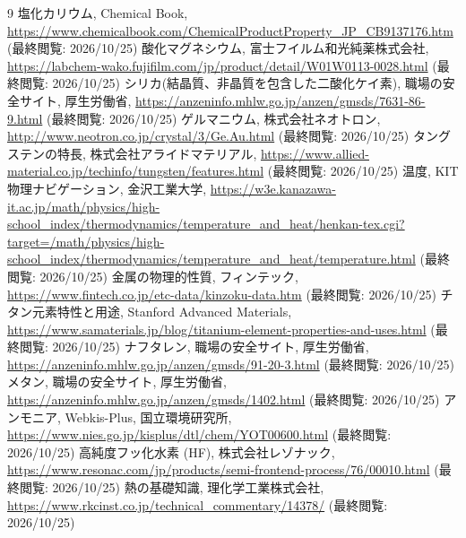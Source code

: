 \documentclass[dvipdfmx, a4paper]{jsarticle}
\begin{document}
  \begin{thebibliography}{9}
     塩化カリウム, Chemical Book, \url{https://www.chemicalbook.com/ChemicalProductProperty_JP_CB9137176.htm} (最終閲覧: 2026/10/25)
     酸化マグネシウム, 富士フイルム和光純薬株式会社, \url{https://labchem-wako.fujifilm.com/jp/product/detail/W01W0113-0028.html} (最終閲覧: 2026/10/25)
     シリカ(結晶質、非晶質を包含した二酸化ケイ素), 職場の安全サイト, 厚生労働省, \url{https://anzeninfo.mhlw.go.jp/anzen/gmsds/7631-86-9.html} (最終閲覧: 2026/10/25)
     ゲルマニウム, 株式会社ネオトロン, \url{http://www.neotron.co.jp/crystal/3/Ge.Au.html} (最終閲覧: 2026/10/25)
     タングステンの特長, 株式会社アライドマテリアル, \url{https://www.allied-material.co.jp/techinfo/tungsten/features.html} (最終閲覧: 2026/10/25)
     温度, KIT物理ナビゲーション, 金沢工業大学, \url{https://w3e.kanazawa-it.ac.jp/math/physics/high-school_index/thermodynamics/temperature_and_heat/henkan-tex.cgi?target=/math/physics/high-school_index/thermodynamics/temperature_and_heat/temperature.html} (最終閲覧: 2026/10/25)
     金属の物理的性質, フィンテック, \\\url{https://www.fintech.co.jp/etc-data/kinzoku-data.htm} (最終閲覧: 2026/10/25)
     チタン元素特性と用途, Stanford Advanced Materials, \url{https://www.samaterials.jp/blog/titanium-element-properties-and-uses.html} (最終閲覧: 2026/10/25)
     ナフタレン, 職場の安全サイト, 厚生労働省, \url{https://anzeninfo.mhlw.go.jp/anzen/gmsds/91-20-3.html} (最終閲覧: 2026/10/25)
     メタン, 職場の安全サイト, 厚生労働省, \url{https://anzeninfo.mhlw.go.jp/anzen/gmsds/1402.html} (最終閲覧: 2026/10/25)
     アンモニア, Webkis-Plus, 国立環境研究所, \url{https://www.nies.go.jp/kisplus/dtl/chem/YOT00600.html} (最終閲覧: 2026/10/25)
     高純度フッ化水素 (HF), 株式会社レゾナック, \url{https://www.resonac.com/jp/products/semi-frontend-process/76/00010.html} (最終閲覧: 2026/10/25)
     熱の基礎知識, 理化学工業株式会社, \url{https://www.rkcinst.co.jp/technical_commentary/14378/} (最終閲覧: 2026/10/25)
  \end{thebibliography}
\end{document}
